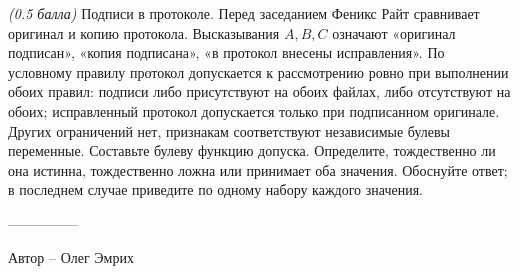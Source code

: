 \question
\textit{(0.5 балла)} Подписи в протоколе. Перед заседанием Феникс Райт сравнивает оригинал и копию протокола. Высказывания $A,B,C$ означают «оригинал подписан», «копия подписана», «в протокол внесены исправления». По условному правилу протокол допускается к рассмотрению ровно при выполнении обоих правил: подписи либо присутствуют на обоих файлах, либо отсутствуют на обоих; исправленный протокол допускается только при подписанном оригинале. Других ограничений нет, признакам соответствуют независимые булевы переменные.
Составьте булеву функцию допуска. Определите, тождественно ли она истинна, тождественно ложна или принимает оба значения. Обоснуйте ответ; в последнем случае приведите по одному набору каждого значения.

---------------

Автор -- Олег Эмрих
